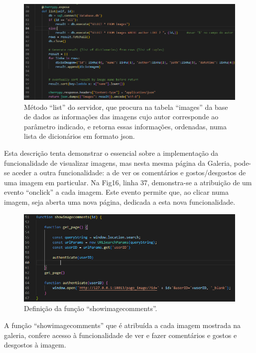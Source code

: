 \documentclass{report}
\begin{document}
\begin{figure}[!hbtp]
        \centering
        \includegraphics[scale=0.55]{Images_code/10 - app list.png}
        \caption{\label{Estrutura}Método “list” do servidor, que procura na tabela “images” da base de dados as informações das imagens cujo autor corresponde ao parâmetro indicado, e retorna essas informações, ordenadas, numa lista de dicionários em formato json.}
\end{figure}

\newpage


 Esta descrição tenta demonstrar o essencial sobre a implementação da funcionalidade de visualizar imagens, mas nesta mesma página da Galeria, pode-se aceder a outra funcionalidade: a de ver os comentários e gostos/desgostos de uma imagem em particular. Na Fig16, linha 37, demonstra-se a atribuição de um evento “onclick” a cada imagem. Este evento permite que, ao clicar numa imagem, seja aberta uma nova página, dedicada a esta nova funcionalidade.

\begin{figure}[!hbtp]
        \centering
        \includegraphics[scale=0.60]{Images_code/10 - js gallery image.png}
        \caption{\label{Estrutura}Definição da função “showimagecomments”.}
\end{figure}

\bigskip

 A função “showimagecomments” que é atribuída a cada imagem mostrada na galeria, confere acesso à funcionalidade de ver e fazer comentários e gostos e desgostos à imagem. 
\end{document}
